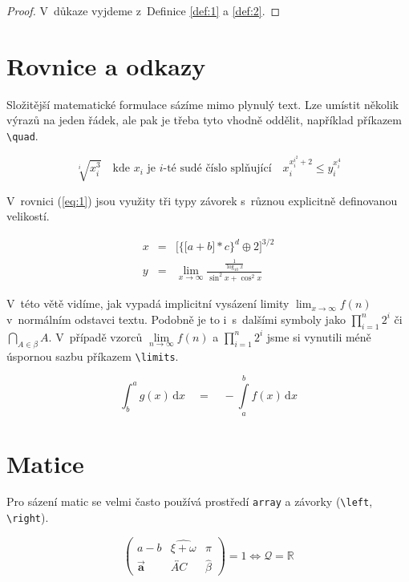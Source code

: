 \documentclass[twocolumn, 11pt]{article}
\theoremstyle{definition}
\begin{document}
\begin{proof}
V~důkaze vyjdeme z~Definice \ref{def:1} a \ref{def:2}.
\end{proof}

\section{Rovnice a odkazy}
Složitější matematické formulace sázíme mimo plynulý text. 
Lze umístit několik výrazů na jeden řádek, ale pak je třeba tyto vhodně oddělit, například příkazem \verb|\quad|.

\[\sqrt[i]{x_i^3} \quad \text{kde } x_i \text{ je } i\text{-té sudé číslo splňující} \quad x_i^{x_i^{i^2} + 2} \leq y_i^{x_i^4}\]

V~rovnici (\ref{eq:1}) jsou využity tři typy závorek s~různou explicitně definovanou velikostí.

\begin{eqnarray} \label{eq:1}
x & = & \bigg[ \Big\{ \big[ a + b \big] * c \Big\}^{d} \oplus 2 \bigg]^{3 / 2} \\
y & = & \lim_{x \rightarrow \infty} \frac{\frac{1}{\log_{10}{x}}}{\sin^{2} x + \cos^{2} x} \nonumber
\end{eqnarray}

V~této větě vidíme, jak vypadá implicitní vysázení limity $\lim_{x \to \infty} f(n)$ v~normálním odstavci textu. 
Podobně je to i~s~dalšími symboly jako $\prod^n_{i=1} 2^i$ či $\bigcap_{A \in \beta} A$. 
V~případě vzorců $\lim\limits_{n \to \infty} f(n)$ a $\prod\limits^n_{i=1} 2^i$ jsme si vynutili méně úspornou sazbu příkazem \verb|\limits|.

\begin{equation}
\int_{b}^{a} g(x)\,\mathrm{d}x \quad = \quad -\int\limits_{a}^{b} f(x)\,\mathrm{d}x
\end{equation}

\section{Matice}
Pro sázení matic se velmi často používá prostředí \verb|array| a závorky (\verb|\left|, \verb|\right|).

\[\left(\begin{array}{ccc}
a - b & \widehat{\xi + \omega} & \pi \\
\vec{\mathbf{a}} & \overleftrightarrow{AC} & \hat{\beta}
\end{array}\right) = 1 \Longleftrightarrow \mathcal{Q} = \mathbb{R}\]
\end{document}

